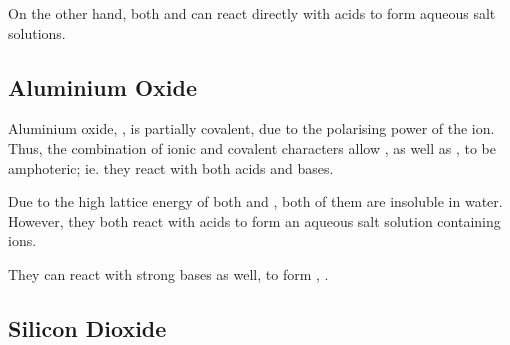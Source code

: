 			On the other hand, both  and  can react directly with acids to form aqueous salt solutions.




		\pagebreak
		\subsection{Aluminium Oxide}

			Aluminium oxide, , is partially covalent, due to the polarising power of the  ion. Thus, the combination of
			ionic and covalent characters allow , as well as , to be amphoteric; ie. they react with both acids and
			bases.

			Due to the high lattice energy of both  and , both of them are insoluble in water. However, they both react
			with acids to form an aqueous salt solution containing  ions.


			They can react with strong bases as well, to form , \ch{[\Al(OH)4]-}.





		\subsection{Silicon Dioxide}

